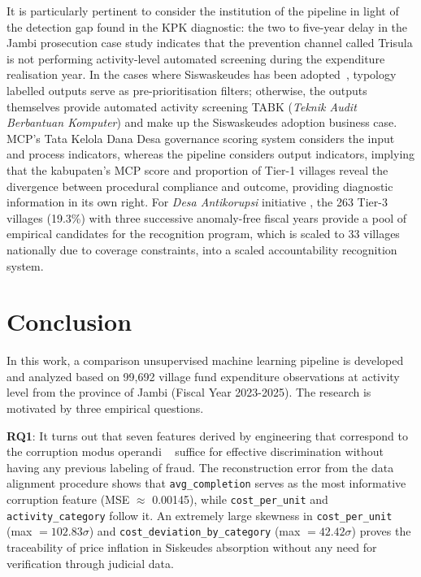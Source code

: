 \documentclass[3p,times,procedia]{elsarticle}
\begin{document}
It is particularly pertinent to consider the institution of the pipeline in light of the detection gap found in the KPK diagnostic: the two to five-year delay in the Jambi prosecution case study indicates that the prevention channel called Trisula \cite{ref4} is not performing activity-level automated screening during the expenditure realisation year. In the cases where Siswaskeudes has been adopted~\cite{ref6}, typology labelled outputs serve as pre-prioritisation filters; otherwise, the outputs themselves provide automated activity screening TABK (\textit{Teknik Audit Berbantuan Komputer}) and make up the Siswaskeudes adoption business case. MCP’s Tata Kelola Dana Desa governance scoring system considers the input and process indicators, whereas the pipeline considers output indicators, implying that the kabupaten’s MCP score and proportion of Tier-1 villages reveal the divergence between procedural compliance and outcome, providing diagnostic information in its own right. For \textit{Desa Antikorupsi} initiative \cite{ref5}, the 263 Tier-3 villages (19.3\%) with three successive anomaly-free fiscal years provide a pool of empirical candidates for the recognition program, which is scaled to 33 villages nationally due to coverage constraints, into a scaled accountability recognition system.


\section{Conclusion}
\label{sec:conclusion}

In this work, a comparison unsupervised machine learning pipeline is developed and analyzed based on 99,692 village fund expenditure observations at activity level from the province of Jambi (Fiscal Year 2023-2025). The research is motivated by three empirical questions.

\textbf{RQ1}: It turns out that seven features derived by engineering that correspond to the corruption modus operandi ~\cite{ref13,ref14} suffice for effective discrimination without having any previous labeling of fraud. The reconstruction error from the data alignment procedure shows that \texttt{avg\_completion} serves as the most informative corruption feature (MSE $\approx$ 0.00145), while \texttt{cost\_per\_unit} and \texttt{activity\_category} follow it. An extremely large skewness in \texttt{cost\_per\_unit} (max $= 102.83\sigma$) and \texttt{cost\_deviation\_by\_category} (max $= 42.42\sigma$) proves the traceability of price inflation in Siskeudes absorption without any need for verification through judicial data.
\end{document}
